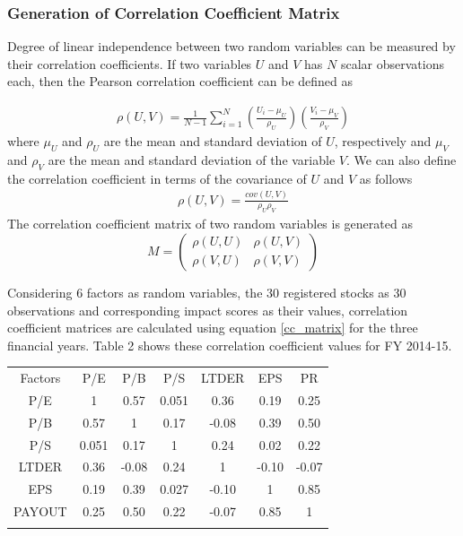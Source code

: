 \documentclass{ws-ijufks}
\begin{document}
\subsubsection{Generation of Correlation Coefficient Matrix}
 Degree of linear independence between two random variables can be measured by their correlation coefficients. If two  
 variables $U$ and $V$ has $N$ scalar observations each, then the Pearson correlation coefficient can be defined as
 
 \begin{equation}
 	\begin{aligned}
 		\rho(U,V)=\frac{1}{N-1}\sum_{i=1}^{N}\left( {\frac{U_i-\mu_{U}}{\rho_{U}}}\right) 
 		\left( 
 		\frac{V_i-\mu_{V}}{\rho_{V}}\right)
 	\end{aligned}
 \end{equation}            
 where $\mu_U$ and $\rho_U$ are the mean and standard deviation of $U$, respectively and $\mu_V$ and $\rho_V$ are the 
 mean and standard deviation of the variable $V$. We can also define the correlation coefficient in terms of the 
 covariance of $U$ and $V$ as follows
 \begin{equation}
 	\begin{aligned}
 		\rho(U,V)=\frac{cov(U,V)}{\rho_U \rho_V}
 	\end{aligned}
 \end{equation}  
 The correlation coefficient matrix of two random variables is generated as
 \begin{equation}
 \label{cc_matrix}
 	M=
 	\begin{pmatrix}
 		\rho(U,U) & \rho(U,V)\\
 		\rho(V,U) & \rho(V,V)
 	\end{pmatrix}
 \end{equation}  

Considering 6 factors as random variables, the 30 registered stocks as 30 observations  and corresponding impact scores 
as their values, correlation coefficient matrices are calculated using equation \ref{cc_matrix} for the three financial 
years. Table 2 shows these correlation coefficient values for FY 2014-15.

\begin{table}[ht]
	\label{tab:table_CorCof}
	{\begin{tabular}{@{}ccccccc@{}} 
			\toprule
			Factors & P/E & P/B & P/S & LTDER & EPS & PR\\
			\colrule
				P/E &	1 &	0.57 & 0.051 & 0.36 & 0.19 & 0.25\\
				P/B & 0.57 & 1 & 0.17 &	-0.08 &	0.39 & 0.50\\
				P/S & 0.051 &	0.17 &	1 &	0.24 &	0.02 &	0.22\\
				LTDER &	0.36 & 	-0.08 &	0.24 &	1 &	-0.10 &	-0.07\\
				EPS	& 0.19 &	0.39 &	0.027 &	-0.10 &	1 &	0.85 \\
				PAYOUT & 0.25 &	0.50 &	0.22 &	-0.07 &	0.85 &	1\\
			\botrule
		\end{tabular}}
	\end{table}
\end{document}
